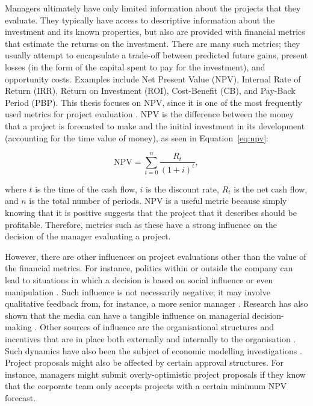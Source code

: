 \documentclass[a4paper, nobind, dvipsnames]{templates/ociamthesis}
\theoremstyle{definition}
\theoremstyle{definition}
\theoremstyle{definition}
\theoremstyle{definition}
\theoremstyle{remark}
\begin{document}
Managers ultimately have only limited information about the projects that they
evaluate. They typically have access to descriptive information about the
investment and its known properties, but also are provided with financial
metrics that estimate the returns on the investment. There are many such
metrics; they usually attempt to encapsulate a trade-off between predicted
future gains, present losses (in the form of the capital spent to pay for the
investment), and opportunity costs. Examples include Net Present Value (NPV),
Internal Rate of Return (IRR), Return on Investment (ROI), Cost-Benefit (CB),
and Pay-Back Period (PBP). This thesis focuses on NPV, since it is one of the
most frequently used metrics for project evaluation \autocite{graham2001,remer1993,graham2015}. NPV is the difference between the money that a project is
forecasted to make and the initial investment in its development (accounting for
the time value of money), as seen in Equation~\eqref{eq:npv}:

\begin{equation}
\text{NPV}=\sum_{t=0}^n \frac{R_t}{(1+i)^t}, \label{eq:npv}
\end{equation}

where \(t\) is the time of the cash flow, \(i\) is the discount rate, \(R_t\) is the
net cash flow, and \(n\) is the total number of periods. NPV is a useful metric
because simply knowing that it is positive suggests that the project that it
describes should be profitable. Therefore, metrics such as these have a strong
influence on the decision of the manager evaluating a project.

However, there are other influences on project evaluations other than the value
of the financial metrics. For instance, politics within or outside the company
can lead to situations in which a decision is based on social influence or even
manipulation \autocite{garbuio2017}. Such influence is not necessarily negative; it may
involve qualitative feedback from, for instance, a more senior manager
\autocite{thamhain2014}. Research has also shown that the media can have a tangible
influence on managerial decision-making \autocite{bednar2013,liu2013}. Other sources
of influence are the organisational structures and incentives that are in place
both externally \autocite{kokkinis2019} and internally to the organisation
\autocite{ullrich2004,rajan2000}. Such dynamics have also been the subject of economic
modelling investigations \autocite{reichelstein1997,cavagnac2005,ortner2017}.
Project proposals might also be affected by certain approval structures. For
instance, managers might submit overly-optimistic project proposals if they know
that the corporate team only accepts projects with a certain minimum NPV
forecast.
\end{document}
